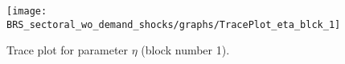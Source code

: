 \begin{figure}[H]
\centering
  \texttt{[image: BRS\_sectoral\_wo\_demand\_shocks/graphs/TracePlot\_eta\_blck\_1]}\\
    \caption{Trace plot for parameter ${\eta}$ (block number 1).}
\end{figure}
